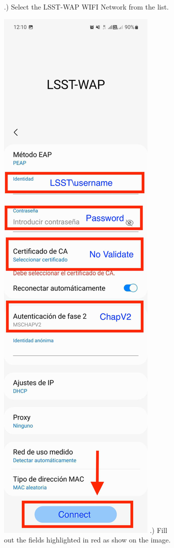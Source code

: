 \begin{figure}
\begin{subfigure}{0.4\textwidth}
      .) Select the LSST-WAP WIFI Network from the list.
    \end{subfigure}
      \hfill
    \begin{subfigure}{0.25\textwidth}
      \includegraphics[width=\textwidth]{Images/Android2.jpg}
      .) Fill out the fields highlighted in red as show on the image.
    \end{subfigure}
  \end{figure}
